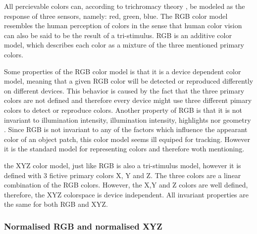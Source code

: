 \documentclass[a4paper,11pt]{article}
\begin{document}
All percievable colors can, according to trichromacy theory \cite{gevers_color}, be modeled as the response of three sensors, namely: red, green, blue. The RGB color model resembles the human perception of colors in the sense that human color vision can also be said to be the result of a tri-stimulus.  RGB is an additive color model, which describes each color as a mixture of the three mentioned primary colors.

Some properties of the RGB color model is that it is a device dependent color model, meaning that a given RGB color will be detected or reproduced differently on different devices. This behavior is caused by the fact that the three primary colors are not defined and therefore every device might use three different pimary colors to detect or reproduce colors. Another property of RGB is that it is not invariant to illumination intensity, illumination intensity, highlights nor geometry \cite{gevers_invariant}. Since RGB is not invariant to any of the factors which influence the appearant color of an object patch, this color model seems ill equiped for tracking. However it is the standard model for representing colors and therefore woth mentioning.

the XYZ color model, just like RGB is also a tri-stimulus model, however it is defined  with 3 fictive primary colors X, Y and Z. The three colors are a linear combination of the RGB colors. However, the X,Y and Z colors are well defined, therefore, the XYZ colorspace is device independent. All invariant properties are the same for both RGB and XYZ.

		

		
\subsubsection{Normalised RGB and normalised XYZ}
\end{document}
